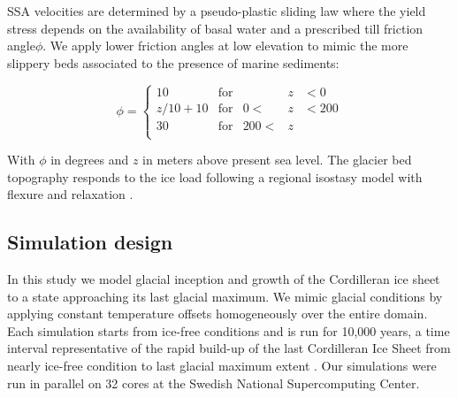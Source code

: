 SSA velocities are determined by a pseudo-plastic sliding law where the yield stress depends on the availability of basal water and a prescribed till friction angle$\phi$. We apply lower friction angles at low elevation to mimic the more slippery beds associated to the presence of marine sediments:

\begin{equation}
	\phi = \left\{\begin{array}{llrll}
		10      & \mathrm{for} &      &z&<  0 \\
		z/10+10 & \mathrm{for} &   0 <&z&<200 \\
		30      & \mathrm{for} & 200 <&z&     \\
	\end{array}\right.
\end{equation}

With $\phi$ in degrees and $z$ in meters above present sea level. The glacier bed topography responds to the ice load following a regional isostasy model with flexure and relaxation \citep{lingle-clark-1985}.

\subsection{Simulation design}

In this study we model glacial inception and growth of the Cordilleran ice sheet to a state approaching its last glacial maximum. We mimic glacial conditions by applying constant temperature offsets homogeneously over the entire domain. Each simulation starts from ice-free conditions and is run for 10,000 years, a time interval representative of the rapid build-up of the last Cordilleran Ice Sheet from nearly ice-free condition to last glacial maximum extent \needref. Our simulations were run in parallel on 32 cores at the Swedish National Supercomputing Center.


